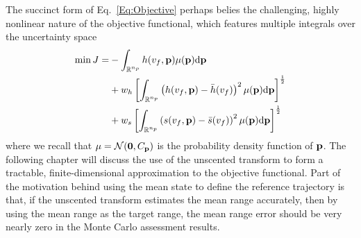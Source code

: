 The succinct form of Eq.~\eqref{Eq:Objective} perhaps belies the challenging, highly nonlinear nature of the objective functional, which features multiple integrals over the uncertainty space
\begin{align}
	\min J = &-\int_{\mathbb{R}^{n_p}}h(v_f,\mathbf{p})\mu(\mathbf{p})\mathrm{d}\mathbf{p} \nonumber\\
	&+ w_h\left[\int_{\mathbb{R}^{n_p}}\left(h(v_f,\mathbf{p}) - \bar{h}(v_f)\right)^2\mu(\mathbf{p})\mathrm{d}\mathbf{p}\right]^{\frac{1}{2}} \\
	&+ w_s\left[\int_{\mathbb{R}^{n_p}}\left(s(v_f,\mathbf{p}) - \bar{s}(v_f)\right)^2\mu(\mathbf{p})\mathrm{d}\mathbf{p}\right]^{\frac{1}{2}}\nonumber
\end{align}
where we recall that $\mu = \mathcal{N}(\mathbf{0},C_{\mathbf{p}})$ is the probability density function of $\mathbf{p}$. The following chapter will discuss the use of the unscented transform to form a tractable, finite-dimensional approximation to the objective functional. Part of the motivation behind using the mean state to define the reference trajectory is that, if the unscented transform estimates the mean range accurately, then by using the mean range as the target range, the mean range error should be very nearly zero in the Monte Carlo assessment results. 

